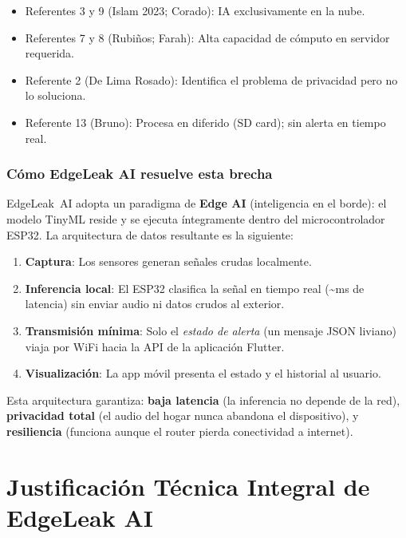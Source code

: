 \documentclass[12pt,a4paper]{article}
\begin{document}
\begin{itemize}[nosep]
  \item Referentes 3 y 9 (Islam 2023; Corado): IA exclusivamente en la nube.
  \item Referentes 7 y 8 (Rubiños; Farah): Alta capacidad de cómputo en servidor requerida.
  \item Referente 2 (De Lima Rosado): Identifica el problema de privacidad pero no lo soluciona.
  \item Referente 13 (Bruno): Procesa en diferido (SD card); sin alerta en tiempo real.
\end{itemize}

\subsubsection{Cómo EdgeLeak AI resuelve esta brecha}

EdgeLeak~AI adopta un paradigma de \textbf{Edge AI} (inteligencia en el borde): el
modelo TinyML reside y se ejecuta íntegramente dentro del microcontrolador ESP32.
La arquitectura de datos resultante es la siguiente:

\begin{enumerate}[nosep]
  \item \textbf{Captura}: Los sensores generan señales crudas localmente.
  \item \textbf{Inferencia local}: El ESP32 clasifica la señal en tiempo real
    (\textasciitilde{}ms de latencia) sin enviar audio ni datos crudos al exterior.
  \item \textbf{Transmisión mínima}: Solo el \textit{estado de alerta} (un mensaje JSON
    liviano) viaja por WiFi hacia la API de la aplicación Flutter.
  \item \textbf{Visualización}: La app móvil presenta el estado y el historial al usuario.
\end{enumerate}

Esta arquitectura garantiza: \textbf{baja latencia} (la inferencia no depende de la red),
\textbf{privacidad total} (el audio del hogar nunca abandona el dispositivo), y
\textbf{resiliencia} (funciona aunque el router pierda conectividad a internet).

\newpage

\section{Justificación Técnica Integral de EdgeLeak AI}
\end{document}
